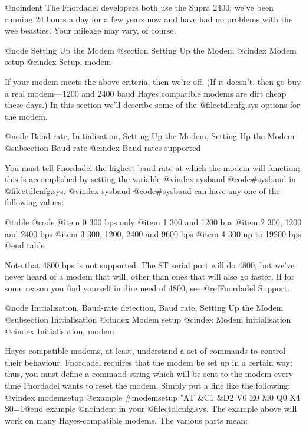 @noindent
The Fnordadel developers both use the Supra 2400; we've been
running 24 hours a day for a few years now and have had no problems
with the wee beasties.  Your mileage may vary, of course.

@node Setting Up the Modem
@section Setting Up the Modem
@cindex Modem setup
@cindex Setup, modem

If your modem meets the above criteria, then we're off.
(If it doesn't, then go buy a real modem---1200 and 2400 baud Hayes
compatible modems are dirt cheap these days.)  In this section we'll
describe some of the @file{ctdlcnfg.sys} options for the modem.

@node Baud rate, Initialisation, Setting Up the Modem, Setting Up the Modem
@subsection Baud rate
@cindex Baud rates supported

You must tell Fnordadel the highest baud rate
at which the modem will function; this is accomplished by
setting the variable
@vindex sysbaud
@code{#sysbaud} in @file{ctdlcnfg.sys}.
@vindex sysbaud
@code{#sysbaud}
can have any one of the following values:

@table @code
@item 0
300 bps only
@item 1
300 and 1200 bps
@item 2
300, 1200 and 2400 bps
@item 3
300, 1200, 2400 and 9600 bps
@item 4
300 up to 19200 bps
@end table

Note that 4800 bps is not supported.  The ST serial port
will do 4800, but we've never heard of a modem that will,
other than ones that will also go faster.  If for some
reason you find yourself in dire need of 4800, see @ref{Fnordadel Support}.

@node Initialisation, Baud-rate detection, Baud rate, Setting Up the Modem
@subsection Initialisation
@cindex Modem setup
@cindex Modem initialisation
@cindex Initialisation, modem

Hayes compatible modems, at least, understand
a set of commands to control their behaviour.  Fnordadel
requires that the modem be set up in a certain way; thus,
you must define a command string which will be sent to the
modem every time Fnordadel wants to reset the modem.
Simply put a line like the following:
@vindex modemsetup
@example
#modemsetup "AT &C1 &D2 V0 E0 M0 Q0 X4 S0=1\r%
@end example
@noindent
in your @file{ctdlcnfg.sys}.  The example above will work on many
Hayes-compatible modems.  The various parts mean:

